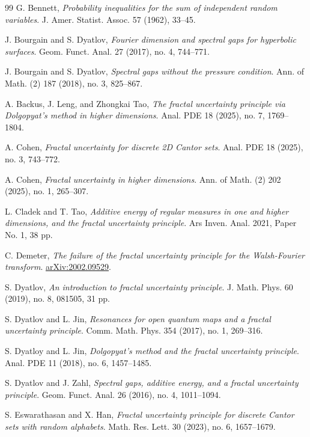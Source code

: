 \documentclass[12pt,reqno]{amsart}
\theoremstyle{plain}
\theoremstyle{remark}
\numberwithin{equation}{section}
\begin{document}
\begin{thebibliography}{99}
 G. Bennett,
\textit{Probability inequalities for the sum of independent random variables}. J. Amer. Statist. Assoc. 57 (1962), 33--45.

 J. Bourgain and S. Dyatlov, 
\textit{Fourier dimension and spectral gaps for hyperbolic surfaces}. Geom. Funct. Anal. 27 (2017), no. 4, 744--771. 

 J. Bourgain and S. Dyatlov, 
\textit{Spectral gaps without the pressure condition}. Ann. of Math. (2) 187 (2018), no. 3, 825--867.

 A. Backus, J. Leng, and Zhongkai Tao,
\textit{The fractal uncertainty principle via Dolgopyat's method in higher dimensions}. Anal. PDE 18 (2025), no. 7, 1769--1804.

 A. Cohen,
\textit{Fractal uncertainty for discrete 2D Cantor sets}. Anal. PDE 18 (2025), no. 3, 743--772.

 A. Cohen,
\textit{Fractal uncertainty in higher dimensions}. Ann. of Math. (2) 202 (2025), no. 1, 265--307.

 L. Cladek and T. Tao,
\textit{Additive energy of regular measures in one and higher dimensions, and the fractal uncertainty principle}. Ars Inven. Anal. 2021, Paper No. 1, 38 pp.

 C. Demeter,
\textit{The failure of the fractal uncertainty principle for the Walsh-Fourier transform}. \href{https://arxiv.org/abs/2002.09529}{arXiv:2002.09529}.

 S. Dyatlov,
\textit{An introduction to fractal uncertainty principle}. J. Math. Phys. 60 (2019), no. 8, 081505, 31 pp.

 S. Dyatlov and L. Jin, 
\textit{Resonances for open quantum maps and a fractal uncertainty principle}. Comm. Math. Phys. 354 (2017), no. 1, 269--316.

 S. Dyatloy and L. Jin, 
\textit{Dolgopyat's method and the fractal uncertainty principle}. Anal. PDE 11 (2018), no. 6, 1457--1485.

 S. Dyatlov and J. Zahl,
\textit{Spectral gaps, additive energy, and a fractal uncertainty principle}. Geom. Funct. Anal. 26 (2016), no. 4, 1011--1094.

 S. Eswarathasan and X. Han,
\textit{Fractal uncertainty principle for discrete Cantor sets with random alphabets}. Math. Res. Lett. 30 (2023), no. 6, 1657--1679.


\end{thebibliography}
\end{document}
